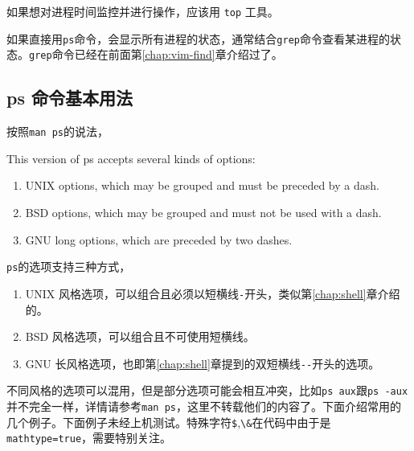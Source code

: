 \documentclass[doctor,openright,twoside]{sjtuthesis}
\renewenvironment{quote}
  {\list{}{\rightmargin\leftmargin}%
    \item\relax}
  {\endlist}
\providecommand{\tightlist}{%
    \setlength{\itemsep}{0pt}\setlength{\parskip}{0pt}}
\newcommand{\passthrough}[1]{#1}
\theoremstyle{plain}
\theoremstyle{definition}
\theoremstyle{remark}
\theoremstyle{ocrenumbox}
\theoremstyle{plain}
\begin{document}
如果想对进程时间监控并进行操作，应该用 \passthrough{\lstinline!top!} 工具。

如果直接用\passthrough{\lstinline!ps!}命令，会显示所有进程的状态，通常结合\passthrough{\lstinline!grep!}命令查看某进程的状态。\passthrough{\lstinline!grep!}命令已经在前面第\ref{chap:vim-find}章介绍过了。

\hypertarget{ps-}{%
\subsection{ps 命令基本用法}\label{ps-}}

按照\passthrough{\lstinline!man ps!}的说法，

\begin{quote}
This version of ps accepts several kinds of options:

\begin{enumerate}
\def\labelenumi{\arabic{enumi}.}
\tightlist
\item
  UNIX options, which may be grouped and must be preceded by a dash.
\item
  BSD options, which may be grouped and must not be used with a dash.
\item
  GNU long options, which are preceded by two dashes.
\end{enumerate}
\end{quote}

\passthrough{\lstinline!ps!}的选项支持三种方式，

\begin{enumerate}
\def\labelenumi{\arabic{enumi}.}
\tightlist
\item
  UNIX 风格选项，可以组合且必须以短横线\passthrough{\lstinline!-!}开头，类似第\ref{chap:shell}章介绍的。
\item
  BSD 风格选项，可以组合且不可使用短横线。
\item
  GNU 长风格选项，也即第\ref{chap:shell}章提到的双短横线\passthrough{\lstinline!--!}开头的选项。
\end{enumerate}

不同风格的选项可以混用，但是部分选项可能会相互冲突，比如\passthrough{\lstinline!ps aux!}跟\passthrough{\lstinline!ps -aux!}并不完全一样，详情请参考\passthrough{\lstinline!man ps!}，这里不转载他们的内容了。下面介绍常用的几个例子。下面例子未经上机测试。特殊字符\passthrough{\lstinline!$!},\passthrough{\lstinline!\&!}在代码中由于是\passthrough{\lstinline!mathtype=true!}，需要特别关注。
\end{document}
